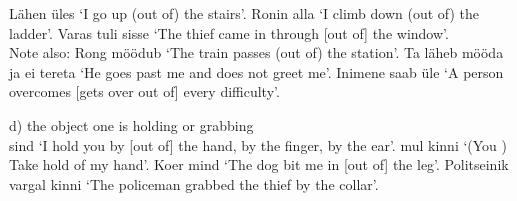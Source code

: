 Lähen  üles `I go up (out of) the stairs'. Ronin  alla `I climb down (out of) the ladder'. Varas tuli  sisse `The thief came in through [out of] the window'. \\

Note also: Rong möödub  `The train passes (out of) the station'. Ta läheb  mööda ja ei tereta `He goes past me and does not greet me'. Inimene saab üle  `A person overcomes [gets over out of] every difficulty'.

\newSection \label{section-116} d) the object one is holding or grabbing \\

 sind  `I hold you by [out of] the hand, by the finger, by the ear'.  mul  kinni `(You \sing) Take hold of my hand'. Koer  mind  `The dog bit me in [out of] the leg'. Politseinik  vargal  kinni `The policeman grabbed the thief by the collar'.

\Text %

\Vocabulary %

\Exercises %

\Expressions %

\AnswersToExercises %